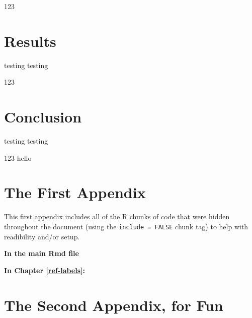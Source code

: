 \documentclass[12pt,twoside]{dukestatscithesis}
\theoremstyle{definition}
\theoremstyle{definition}
\theoremstyle{definition}
\theoremstyle{remark}
\begin{document}
123

\chapter{Results}\label{organization}

testing testing

123

\chapter*{Conclusion}\label{conclusion}

testing testing

123 hello

\appendix

\chapter{The First Appendix}\label{the-first-appendix}

This first appendix includes all of the R chunks of code that were
hidden throughout the document (using the \texttt{include\ =\ FALSE}
chunk tag) to help with readibility and/or setup.

\textbf{In the main Rmd file}
\begin{Shaded}
\begin{Highlighting}[]
  \NormalTok{(}\NormalTok{, } \NormalTok{)}
  \NormalTok{(}\NormalTok{)}
\end{Highlighting}
\end{Shaded}
\textbf{In Chapter \ref{ref-labels}:}

\chapter{The Second Appendix, for
Fun}\label{the-second-appendix-for-fun}

\backmatter
\end{document}
